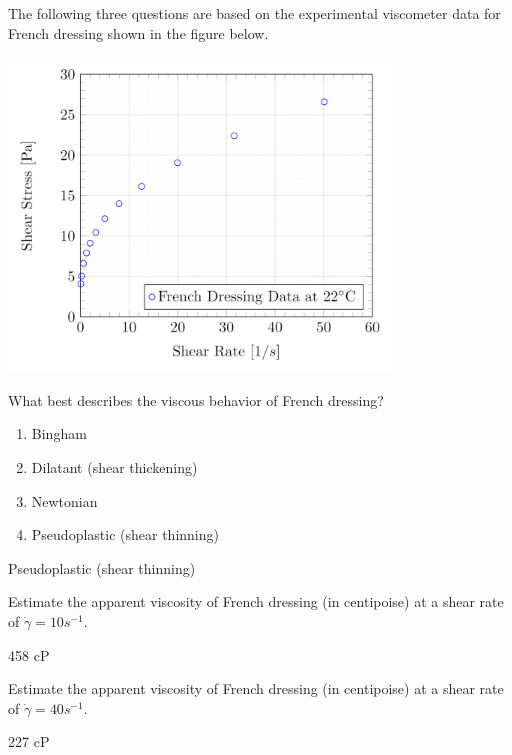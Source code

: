 \documentclass[12pt]{article}
\begin{document}
\begin{question}

The following three questions are based on the experimental viscometer data for French dressing shown in the figure below.

 \includegraphics[width=4in]{imgs/FrenchDressing.png}

What best describes the viscous behavior of French dressing?

\begin{enumerate}
  \item Bingham
  \item Dilatant (shear thickening)
  \item Newtonian
  \item Pseudoplastic (shear thinning)
\end{enumerate}

\begin{solution}
Pseudoplastic (shear thinning)
\end{solution}

\end{question}


\begin{question}

 Estimate the apparent viscosity of French dressing (in centipoise) at a shear rate of $\dot{\gamma}=10 s^{-1}$.

\begin{solution}
458 cP
\end{solution}

\end{question}

\begin{question}

 Estimate the apparent viscosity of French dressing (in centipoise) at a shear rate of $\dot{\gamma}=40 s^{-1}$.

\begin{solution}
227 cP
\end{solution}

\end{question}
\end{document}
